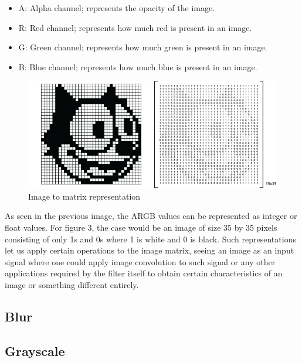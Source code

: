 \documentclass[a4paper,12pt]{article}
\begin{document}
	\begin{itemize}
		\item A: Alpha channel; represents the opacity of the image.
		\item R: Red channel; represents how much red is present in an image.
		\item G: Green channel; represents how much green is present in an image.
		\item B: Blue channel; represents how much blue is present in an image.
	\end{itemize}
	
	
	\begin{figure}[h]
		\begin{center}
			\includegraphics[width=15cm]{sample-matrix.png}
		\end{center}
		\caption{Image to matrix representation}
	\end{figure}
	
	
	
	As seen in the previous image, the ARGB values can be represented as integer or float values. For figure 3, the case would be an image of size 35 by 35 pixels consisting of only 1s and 0s where 1 is white and 0 is black. Such representations let us apply certain operations to the image matrix, seeing an image as an input signal where one could apply image convolution to such signal or any other applications required by the filter itself to obtain certain characteristics of an image or something different entirely. 
	
	\subsection{Blur}
	
	
	
	\subsection{Grayscale}
	
\end{document}
